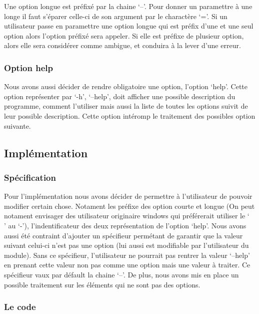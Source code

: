 \documentclass[12pt]{article}
\begin{document}
    Une option longue est préfixé par la chaine `--'. Pour donner un paramettre 
    à une longe il faut s'éparer celle-ci de son argument par le charactère `='. 
    Si un utilisateur passe en paramettre une option longue qui est préfix d'une
    et une seul option alors l'option préfixé sera appeler. Si elle est préfixe 
    de plusieur option, alors elle sera considérer comme ambigue, et conduira à 
    la lever d'une erreur.

    \subsubsection{Option help}

    Nous avons aussi décider de rendre obligatoire une option, l'option `help'.
    Cette option représenter par `-h', `--help', doit afficher une possible 
    description du programme, comment l'utiliser mais aussi la liste de toutes 
    les options suivit de leur possible description. Cette option intéromp le 
    traitement des possibles option suivante. 

    \subsection{Implémentation}

    \subsubsection{Spécification}

    Pour l'implémentation nous avons décider de permettre à l'utilisateur de 
    pouvoir modifier certain chose. Notament les préfixe des option courte et 
    longue (On peut notament envisager des utilisateur originaire windows qui 
    préférerait utiliser le `\\' au `-'), l'indentificateur des deux 
    représentation de l'option `help'. Nous avons aussi été contraint d'ajouter 
    un spécifieur permétant de garantir que la valeur suivant celui-ci n'est pas
    une option (lui aussi est modifiable par l'utilisateur du module). Sans ce 
    spécifieur, l'utilisateur ne pourrait pas rentrer la valeur `--help' en 
    prenant cette valeur non pas comme une option mais une valeur à traiter. Ce 
    spécifieur vaux par défault la chaine `--'. De plus, nous avons mis en place 
    un possible traitement sur les éléments qui ne sont pas des options.
    
    \subsubsection{Le code}
\end{document}
